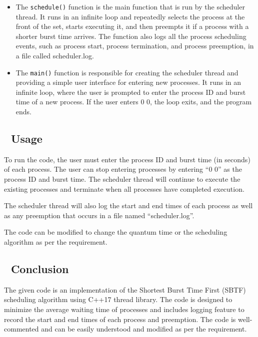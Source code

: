 \begin{itemize}
\item
  The \texttt{schedule()} function is the main function that is run by
  the scheduler thread. It runs in an infinite loop and repeatedly
  selects the process at the front of the set, starts executing it, and
  then preempts it if a process with a shorter burst time arrives. The
  function also logs all the process scheduling events, such as process
  start, process termination, and process preemption, in a file called
  scheduler.log.
\item
  The \texttt{main()} function is responsible for creating the scheduler
  thread and providing a simple user interface for entering new
  processes. It runs in an infinite loop, where the user is prompted to
  enter the process ID and burst time of a new process. If the user
  enters 0 0, the loop exits, and the program ends.
\end{itemize}

\hypertarget{usage}{%
\subsection{🚀 Usage}\label{usage}}

To run the code, the user must enter the process ID and burst time (in
seconds) of each process. The user can stop entering processes by
entering ``0 0'' as the process ID and burst time. The scheduler thread
will continue to execute the existing processes and terminate when all
processes have completed execution.

The scheduler thread will also log the start and end times of each
process as well as any preemption that occurs in a file named
``scheduler.log''.

The code can be modified to change the quantum time or the scheduling
algorithm as per the requirement.

\hypertarget{conclusion}{%
\subsection{🌳 Conclusion}\label{conclusion}}

The given code is an implementation of the Shortest Burst Time First
(SBTF) scheduling algorithm using C++17 thread library. The code is
designed to minimize the average waiting time of processes and includes
logging feature to record the start and end times of each process and
preemption. The code is well-commented and can be easily understood and
modified as per the requirement.
